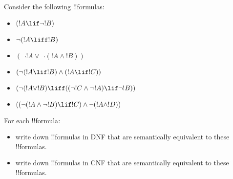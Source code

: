 \documentclass[../../../include/open-logic-section]{subfiles}
\begin{document}
\begin{prob}
Consider the following !!{formula}s:
	\begin{itemize}
		\item $( !A \lif \lnot !B )$
		\item $\lnot ( !A \liff !B )$
		\item $(\lnot  !A \lor \lnot ( !A \land !B ))$
		\item $(\lnot ( !A \lif !B  ) \land ( !A \lif !C ))$
		\item $(\lnot ( !A \lor !B ) \liff ((\lnot !C \land \lnot  !A) \lif \lnot !B ))$
		\item $((\lnot ( !A \land \lnot !B ) \lif !C ) \land \lnot ( !A \land !D))$
	\end{itemize}
For each !!{formula}:
	\begin{itemize}
		\item write down !!{formula}s in DNF that are semantically equivalent to these !!{formula}s.
		\item write down !!{formula}s in CNF that are semantically equivalent to these !!{formula}s. 
	\end{itemize}
\end{prob}
\end{document}
